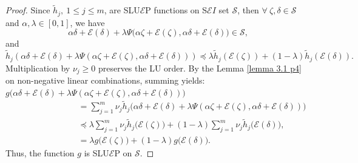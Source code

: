 \documentclass[12pt, reqno]{amsart}
\theoremstyle{definition}
\theoremstyle{remark}
\numberwithin{equation}{section}
\begin{document}
    \begin{proof}
    	Since $ \tilde{h}_j,~1\leq j\leq m$, are SLU$\mathcal{E}$P functions on S$\mathcal{E}I$ set ${\mathcal{S}}$, then   $\forall~\mathit{\zeta} ,\mathit{\delta} \in  {\mathcal{S}}$ and $ {\alpha},{\lambda}\in {[0,1]} $, we have\\
    	\begin{equation*}
    		 {\alpha} \mathit{\delta} + {\mathcal{E}} (\mathit{\delta} )+ {\lambda} {\Psi}\big( {\alpha} \mathit{\zeta} + {\mathcal{E}}(\mathit{\zeta} ), {\alpha} \mathit{\delta} + {\mathcal{E}} (\mathit{\delta} )\big)\in{\mathcal{S}},
    	\end{equation*}
        and
        \begin{equation*}
             \tilde{h}_j \left( \alpha \mathit{\delta}  + \mathcal{\mathcal{E}}(\mathit{\delta} ) + \lambda\Psi(\alpha \mathit{\zeta}  + \mathcal{\mathcal{E}}(\mathit{\zeta} ), \alpha \mathit{\delta}  + \mathcal{\mathcal{E}}(\mathit{\delta} )) \right) \preceq \lambda \tilde{h}_j(\mathcal{E}(\mathit{\zeta} )) + (1 - \lambda) \tilde{h}_j(\mathcal{E}(\mathit{\delta} )).
        \end{equation*}
   Multiplication by $\nu_j \geq 0$ preserves the LU order. By the Lemma \ref{lemma 3.1 p4} on non-negative linear combinations, summing yields:\\
    ${g}\big({\alpha}\mathit{\delta} + {\mathcal{E}} (\mathit{\delta} )+ {\lambda} {\Psi}( {\alpha}\mathit{\zeta} +{\mathcal{E}}(\mathit{\zeta} ), {\alpha}\mathit{\delta} + {\mathcal{E}} (\mathit{\delta} ))\big)$
    	\begin{equation*}
    	    \begin{aligned}
    	        \hspace{3cm} &=\sum\limits_{j=1}^{m}\nu_j\tilde{h}_j\big( {\alpha}\mathit{\delta} + {\mathcal{E}} (\mathit{\delta} )+ {\lambda} {\Psi}( {\alpha}\mathit{\zeta} + {\mathcal{E}}(\mathit{\zeta} ), {\alpha}\mathit{\delta} + {\mathcal{E}} (\mathit{\delta} ))\big)\\
    		&\preceq  {\lambda} \sum\limits_{j=1}^{m}\nu_j\tilde{h}_j\big( {\mathcal{E}}(\mathit{\zeta} )\big)+(1- {\lambda})  
    		\sum\limits_{j=1}^{m}\nu_j\tilde{h}_j\big({\mathcal{E}} (\mathit{\delta} )\big),\\
    		&= {\lambda} {g}\big({\mathcal{E}}(\mathit{\zeta} )\big)+(1-{\lambda}){g}\big({\mathcal{E}} (\mathit{\delta} )\big).
    	    \end{aligned}
    	\end{equation*}
    	 Thus, the function ${g}$ is SLU$\mathcal{E}$P on $ {\mathcal{S}}$.
    \end{proof}
     
\end{document}
